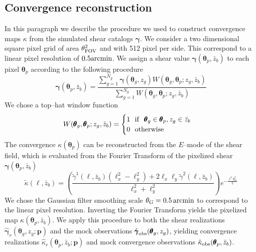 \documentclass[reprint,aps,prd,superscriptaddress,showkeys,showpacs]{revtex4-1}
\newcommand{\bb}[1]{\mathbf{#1}}
\newcommand{\h}[1]{\hat{#1}}
\begin{document}
\subsection{Convergence reconstruction}
In this paragraph we describe the procedure we used to construct convergence maps $\kappa$ from the simulated shear catalogs $\pmb{\gamma}$. We consider a two dimensional square pixel grid of area $\theta_{\rm FOV}^2$ and with 512 pixel per side. This correspond to a linear pixel resolution of $0.5 \rm{arcmin}$. We assign a shear value $\pmb{\gamma}(\pmb{\theta}_p,\bar{z}_b)$ to each pixel $\pmb{\theta}_p$ according to the following procedure
\begin{equation}
\pmb{\gamma}(\pmb{\theta}_p,\bar{z}_b) = \frac{\sum_{g=1}^{N_g}\pmb{\gamma}(\pmb{\theta}_g,z_g)W(\pmb{\theta}_g,\pmb{\theta}_p;z_g,\bar{z}_b)}{\sum_{g=1}^{N_g}W(\pmb{\theta}_g,\pmb{\theta}_p;z_g,\bar{z}_b)}
\end{equation}   
%
We chose a top--hat window function
\begin{equation}
W(\pmb{\theta}_g,\pmb{\theta}_p;z_g,\bar{z}_b) = 
\begin{cases}
1 \,\,\,\,{\rm if}\,\,\,\, \pmb{\theta}_g\in\pmb{\theta}_p,z_g\in\bar{z}_b \\
0 \,\,\,\,{\rm otherwise}
\end{cases}
\end{equation} 
%
The convergence $\kappa(\pmb{\theta}_p)$ can be reconstructed from the $E$--mode of the shear field, which is evaluated from the Fourier Transform of the pixelized shear $\pmb{\gamma}(\pmb{\theta}_p,\bar{z}_b)$
\begin{equation}
\label{meth:psdefinition}
\tilde\kappa(\pmb{\ell},\bar{z}_b) = \left(\frac{\tilde{\gamma}^1(\pmb{\ell},\bar{z}_b)(\ell_x^2-\ell_y^2)+2\ell_x\ell_y\tilde{\gamma}^2(\pmb{\ell},\bar{z}_b)}{\ell_x^2+\ell_y^2}\right) e^{-\frac{\ell^2\theta_G^2}{2}}
\end{equation}
%
We chose the Gaussian filter smoothing scale $\theta_G=0.5\,{\rm arcmin}$ to correspond to the linear pixel resolution. Inverting the Fourier Transform yields the pixelized map $\kappa(\pmb{\theta}_p,\bar{z}_b)$. We apply this procedure to both the shear realizations $\h{\pmb{\gamma}}_r(\pmb{\theta}_g,z_g;\bb{p})$ and the mock observations $\h{\pmb{\gamma}}_{\rm obs}(\pmb{\theta}_g,z_g)$, yielding convergence realizations $\h{\kappa}_r(\pmb{\theta}_p,\bar{z}_b;\bb{p})$ and mock convergence observations $\h{\kappa}_{\rm obs}(\pmb{\theta}_p,\bar{z}_b)$. 
\end{document}
